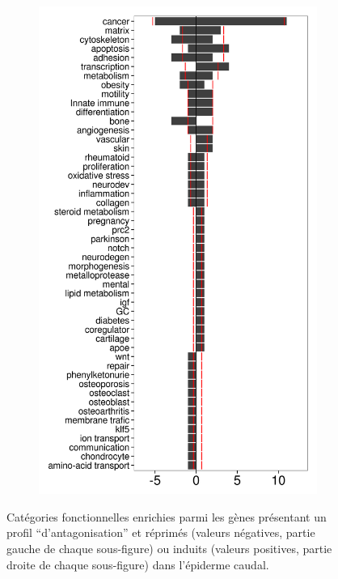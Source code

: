 \begin{figure}[!htbp]
\begin{subfigure}{0.49\textwidth}
	\includegraphics[width=\textwidth]
	{Figures/tfc-manualannot-antago/tfc-manualannot-antago-t.png}
	\caption{}
	\label{subfig:tfc-manualannot-antago-t}
\end{subfigure}
\caption[Catégories fonctionnelles enrichies parmi les gènes ``antagonisés'' dans l'épiderme caudal]
{
Catégories fonctionnelles enrichies parmi les gènes présentant un profil ``d'antagonisation'' et réprimés (valeurs négatives, partie gauche de chaque sous-figure) ou induits (valeurs positives, partie droite de chaque sous-figure) dans l'épiderme caudal.
}
\end{figure}
